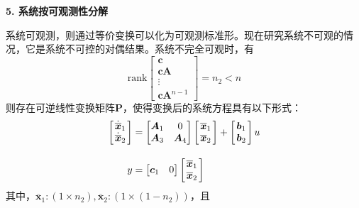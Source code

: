 \noindent \textbf{5. 系统按可观测性分解}

系统可观测，则通过等价变换可以化为可观测标准形。现在研究系统不可观的情况，它是系统不可控的对偶结果。系统不完全可观时，有
\begin{equation}
	\text{rank}
	\begin{bmatrix}
		\bm{c} \\ 
		\bm{cA}\\
		\vdots \\
		\bm{c} \bm{A}^{n-1}
	\end{bmatrix}
	= n_2 < n
	\label{不可观}
\end{equation}
则存在可逆线性变换矩阵$\bm{P}$，使得变换后的系统方程具有以下形式：
\begin{align}
	\begin{bmatrix}
		\hspace*{0.5mm}\dot{\overline{\bm{x}}}_1 \hspace*{0.5mm}\\
		\dot{\overline{\bm{x}}}_2 \\
	\end{bmatrix}
	&=
	\begin{bmatrix}
		\bm{A}_1 & 0\\
		\bm{A}_3 & \bm{A}_4
	\end{bmatrix}
	\begin{bmatrix}
		\hspace*{0.5mm}\overline{\bm{x}}_1 \hspace*{0.5mm}\\
		\overline{\bm{x}}_2 \\
	\end{bmatrix}
	+
	\begin{bmatrix}
		\hspace*{0.5mm}	\bm{b}_1 \hspace*{0.5mm}\\
		\bm{b}_2
	\end{bmatrix}u \\[1em]
	y &= 
	\begin{bmatrix}
		\bm{c}_1 & 0
	\end{bmatrix}
	\begin{bmatrix}
		\hspace*{0.5mm}\overline{\bm{x}}_1 \hspace*{0.5mm}\\
		\overline{\bm{x}}_2 \\
	\end{bmatrix}
\end{align}
其中，$\overline{\bm{x}}_1:(1 \times n_2),\overline{\bm{x}}_2:(1 \times (1 - n_2))$，且
